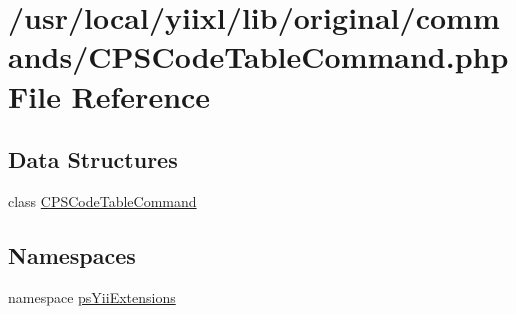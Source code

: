 \hypertarget{CPSCodeTableCommand_8php}{
\section{/usr/local/yiixl/lib/original/commands/CPSCodeTableCommand.php File Reference}
\label{CPSCodeTableCommand_8php}
}
\subsection*{Data Structures}
\begin{DoxyCompactItemize}
\item 
class \hyperlink{classCPSCodeTableCommand}{CPSCodeTableCommand}
\end{DoxyCompactItemize}
\subsection*{Namespaces}
\begin{DoxyCompactItemize}
\item 
namespace \hyperlink{namespacepsYiiExtensions}{psYiiExtensions}
\end{DoxyCompactItemize}
